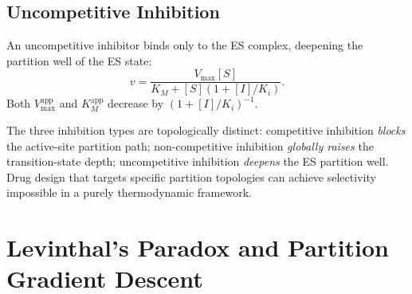 \subsection{Uncompetitive Inhibition}
\label{ssec:uncompetitive}

An uncompetitive inhibitor binds only to the ES complex, deepening the
partition well of the ES state:
\begin{equation}
  v = \frac{V_{\max}[S]}{K_M + [S](1 + [I]/K_i)}.
  \label{eq:uncompetitive}
\end{equation}
Both $V_{\max}^{\mathrm{app}}$ and $K_M^{\mathrm{app}}$ decrease by
$(1 + [I]/K_i)^{-1}$.

\begin{keyresult}
The three inhibition types are topologically distinct:
competitive inhibition \emph{blocks} the active-site partition path;
non-competitive inhibition \emph{globally raises} the transition-state
depth; uncompetitive inhibition \emph{deepens} the ES partition well.
Drug design that targets specific partition topologies can achieve
selectivity impossible in a purely thermodynamic framework.
\end{keyresult}

\section{Levinthal's Paradox and Partition Gradient Descent}
\label{sec:levinthal}

